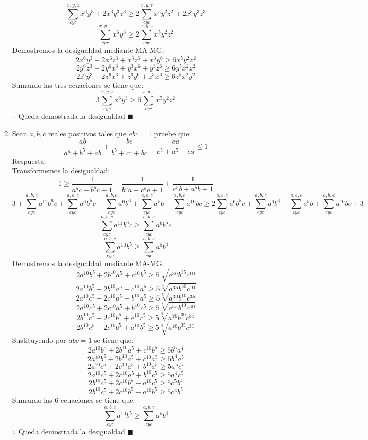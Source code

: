 \documentclass{book}
\begin{document}
\begin{enumerate}
        $$\sum_{cyc}^{x,y,z}x^6 y^3+2x^3 y^3 z^3\geq 2\sum_{cyc}^{x,y,z}x^5 y^2 z^2 +2x^3 y^3 z^3$$
        $$\sum_{cyc}^{x,y,z}x^6 y^3\geq 2\sum_{cyc}^{x,y,z}x^5 y^2 z^2 $$
        Demostremos la desigualdad mediante MA-MG:
        $$2x^6 y^3+2x^6 z^3+x^3 z^6+x^3 y^6\geq 6x^5 y^2 z^2$$
        $$2y^6 z^3+2y^6 x^3+y^3 x^6+y^3 z^6\geq 6y^5 x^2 z^2$$
        $$2z^6 y^3+2z^6 x^3+z^3 y^6+z^3 x^6\geq 6z^5 x^2 y^2$$
        Sumando las tres ecuaciones se tiene que:
        $$3\sum_{cyc}^{x,y,z}x^6 y^3\geq 6\sum_{cyc}^{x,y,z}x^5 y^2 z^2$$
        $\therefore$ Queda demostrada la desigualdad $\blacksquare$\\
        \item Sean $a,b,c$ reales positivos tales que $abc=1$ pruebe que:
        $$\frac{ab}{a^5+b^5+ab}+\frac{bc}{b^5+c^5+bc}+\frac{ca}{c^5+a^5+ca}\leq 1$$
        Respuesta:\\
        Transformemos la desigualdad:
        $$1\geq\frac{1}{a^5 c+b^5 c+1}+\frac{1}{b^5 a+c^5 a+1}+\frac{1}{c^5 b+a^5 b+1}$$
        $$3+\sum_{cyc}^{a,b,c}a^{11} b^6 c+\sum_{cyc}^{a,b,c}a^6 b^5 c+\sum_{cyc}^{a,b,c}a^6 b^6+\sum_{cyc}^{a,b,c}a^5 b+\sum_{cyc}^{a,b,c}a^{10} bc\geq 2\sum_{cyc}^{a,b,c}a^6 b^5c+\sum_{cyc}^{a,b,c}a^6 b^6 +\sum_{cyc}^{a,b,c}a^5 b+\sum_{cyc}^{a,b,c}a^{10} bc+3$$
        $$\sum_{cyc}^{a,b,c}a^{11} b^6 c\geq\sum_{cyc}^{a,b,c}a^6 b^5c$$
        $$\sum_{cyc}^{a,b,c}{a^{10} b^5}\geq\sum_{cyc}^{a,b,c}a^5 b^4 $$
        Demostremos la desigualdad mediante MA-MG:
        $$2 a^{10}b^5 +2 b^{10}a^5 +c^{10}b^5 \geq 5 \sqrt[5]{ a^{30}b^{35}c^{10}}$$
        $$2 a^{10}b^5 +2 b^{10}a^5 +c^{10}a^5 \geq 5 \sqrt[5]{ a^{35}b^{30}c^{10}}$$
        $$2 a^{10}c^5 +2 c^{10}a^5 +b^{10}a^5 \geq 5 \sqrt[5]{ a^{30}b^{10}c^{35}}$$
        $$2 a^{10}c^5 +2 c^{10}a^5 +b^{10}c^5 \geq 5 \sqrt[5]{ a^{35}b^{10}c^{30}} $$
        $$2 b^{10}c^5 +2 c^{10}b^5 +a^{10}c^5 \geq 5 \sqrt[5]{ a^{10}b^{30}c^{35}} $$
        $$2 b^{10}c^5 +2 c^{10}b^5 +a^{10}b^5 \geq 5 \sqrt[5]{ a^{10}b^{35}c^{30}}$$
        Sustituyendo por $abc=1$ se tiene que:
        $$2 a^{10}b^5 +2 b^{10}a^5 +c^{10}b^5 \geq 5 b^5 a^4 $$
        $$2 a^{10}b^5 +2 b^{10}a^5 +c^{10}a^5 \geq 5 b^4 a^5 $$
        $$2 a^{10}c^5 +2 c^{10}a^5 +b^{10}a^5 \geq 5 a^5 c^4 $$
        $$2 a^{10}c^5 +2 c^{10}a^5 +b^{10}c^5 \geq 5 a^4 c^5 $$
        $$2 b^{10}c^5 +2 c^{10}b^5 +a^{10}c^5 \geq 5 c^5 b^4 $$
        $$2 b^{10}c^5 +2 c^{10}b^5 +a^{10}b^5 \geq 5 c^4 b^5 $$
        Sumando las 6 ecuaciones se tiene que:
        $$\sum_{cyc}^{a,b,c}{a^{10} b^5}\geq\sum_{cyc}^{a,b,c}a^5 b^4 $$
        $\therefore$ Queda demostrada la desigualdad $\blacksquare$\\

\end{enumerate}
\end{document}

